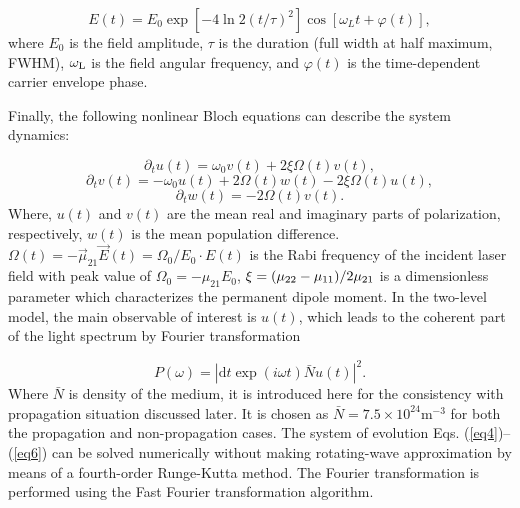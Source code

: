 \documentclass[10pt,letterpaper]{article}
\begin{document}
\begin{equation}
E(t) = {E_0}\exp \left[ { - 4\ln 2{{\left( {t/\tau } \right)}^2}} \right]\cos \left[ {{\omega _L}t + \varphi \left( t \right)} \right],
\label{eq3}
\end{equation}
where $ E_{0} $ is the field amplitude, $ \tau $ is the duration (full width at half maximum, FWHM), $ \omega_{\rm{L}} $ is the field angular frequency, and $ \varphi(t) $ is the time-dependent carrier envelope phase.

Finally, the following nonlinear Bloch equations can describe the system dynamics:

\begin{equation}
 {\partial _t}{u}\left( {t} \right) = {\omega _0}{v}\left( t \right) + 2\xi \Omega \left( t \right){v}\left( t \right),
\label{eq4}
\end{equation}
\begin{equation}
{\partial _t}{v}\left( {t} \right) =  - {\omega _0}{u}\left( t \right) + 2\Omega \left( t \right){w}\left( t \right) - 2\xi \Omega \left( t \right){u}\left( t \right),
\label{eq5}
\end{equation}
\begin{equation}
{\partial _t}{w}\left( {t} \right) =  - 2\Omega \left( t \right){v}\left( t \right).
\label{eq6}
\end{equation}
Where, $ u(t) $ and $ v(t) $ are the mean real and imaginary parts of polarization, respectively, $ w(t) $ is the mean population difference. $\Omega\left( t \right) = - \vec{\mu}_{21}\vec{E}\left(t\right)=\Omega_{0}/E_{0}\cdot E\left(t\right)$ is the Rabi frequency of the incident laser field with peak value of ${\Omega _0} =  - {\mu _{21}}{E_0}$, $\xi  = {{\left( {{\mu _{22}} - {\mu _{11}}} \right)} \mathord{\left/{\vphantom {{\left( {{\mu _{22}} - {\mu _{11}}} \right)} {2{\mu _{21}}}}} \right.\kern-\nulldelimiterspace} {2{\mu _{21}}}}$ is a dimensionless parameter which characterizes the permanent dipole moment. In the two-level model, the main observable of interest is $u(t)$, which leads to the coherent part of the light spectrum by Fourier transformation

\begin{equation}
P(\omega)= \left| \textrm{d}t\exp(i\omega t)\bar{N}u(t)\right|^2.
\label{eq7}
\end{equation}
Where $ \bar{N} $ is density of the medium, it is introduced here for the consistency with propagation situation discussed later. It is chosen as $ \bar{N}=7.5\times10^{24} \textrm{m}^{-3}$ for both the propagation and non-propagation cases. The system of evolution Eqs. (\ref{eq4})--(\ref{eq6}) can be solved numerically without making rotating-wave approximation by means of a fourth-order Runge-Kutta method. The Fourier transformation is performed using the Fast Fourier transformation algorithm.
\end{document}
